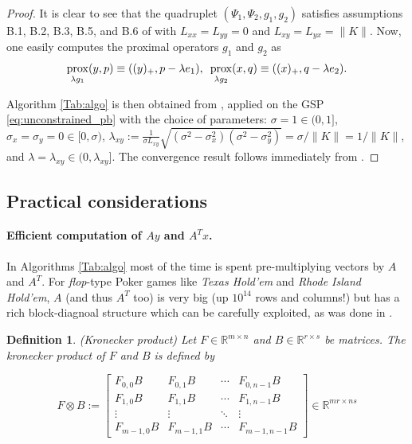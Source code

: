 \documentclass{article} %
\newtheorem{definition}[theorem]{Definition}
\DeclareMathOperator{\prox}{prox}
\begin{document}
\begin{proof}
It is clear to see that the quadruplet $(\Psi_1, \Psi_2, g_1, g_2)$
satisfies assumptions B.1, B.2, B.3, B.5, and B.6 of
\cite{he2013accelerating} with $L_{xx} = L_{yy} = 0$ and $L_{xy} =
L_{yx} = \|K\|$. Now, one easily computes the proximal operators $g_1$
and $g_2$ as
\begin{eqnarray*}
  \prox_{\lambda g_1}(y, p) \equiv ((y)_+, p - \lambda
  e_1),\hspace{.5em} \prox_{\lambda g_2}(x, q) \equiv ((x)_+, q -
  \lambda e_2).
  \end{eqnarray*}

Algorithm \ref{Tab:algo} is then obtained from \cite[Algorithm
  T-BD]{he2013accelerating}, applied on the GSP
\eqref{eq:unconstrained_pb} with the choice of parameters: $\sigma = 1
\in (0, 1]$, $\sigma_x = \sigma_y = 0 \in [0, \sigma)$,
    $\lambda_{xy} := \frac{1}{\sigma L_{xy}}\sqrt{(\sigma^2 -
        \sigma_x^2)(\sigma^2 - \sigma_y^2)} = \sigma / \|K\| =
      1/\|K\|$, and $\lambda = \lambda_{xy} \in (0,
      \lambda_{xy}]$. The convergence result follows immediately from
  \cite[Theorem 4.2]{he2013accelerating}.
\end{proof}

\subsection{Practical considerations}
\paragraph{\textbf{Efficient computation of $Ay$ and $A^Tx$.}}
In Algorithms \ref{Tab:algo} most of the time is spent
pre-multiplying vectors by $A$ and $A^T$. For \textit{flop}-type Poker
games like \textit{Texas Hold'em} and  \textit{Rhode Island Hold'em},
$A$ (and thus $A^T$ too)  is very big (up $10^{14}$ rows and columns!)
but has a rich block-diagnoal structure which can be carefully
exploited, as was done in \cite{hoda2010smoothing}.


\begin{definition}(Kronecker product)
Let $F \in \mathbb{R}^{m \times n}$ and $B \in \mathbb{R}^{r \times
  s}$ be matrices. The kronecker product of $F$ and $B$ is defined by

\begin{equation}
F \otimes B:=\left[
\begin{array}{cccc}
F_{0,0}B & F_{0,1}B & \cdots & F_{0,n-1}B \\
F_{1,0}B & F_{1,1}B & \cdots & F_{1,n-1}B \\
\vdots & \vdots & \ddots & \vdots\\
F_{m-1,0}B & F_{m-1,1}B & \cdots & F_{m-1,n-1}B 
\end{array}\right] \in \mathbb{R}^{mr \times ns}
\end{equation}
\end{definition}
\end{document}
